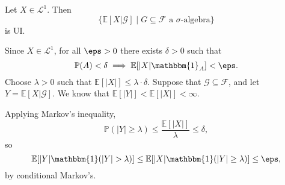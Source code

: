 \documentclass[12pt]{article}
\begin{document}
\begin{theorem}
	Let $X \in \mathcal{L}^1$. Then
	\[
		\{\mathbb{E}[X | \mathcal{G}] \mid G \subseteq \mathcal{F} \text{ a $\sigma$-algebra}\}
	\]
	is UI.
\end{theorem}

\begin{proofbox}
	Since $X \in \mathcal{L}^1$, for all $\eps > 0$ there exists $\delta > 0$ such that
	\[
	\mathbb{P}(A) < \delta \implies \mathbb{E}[|X| \mathbbm{1}_{A}] < \eps.
	\]
	Choose $\lambda > 0$ such that $\mathbb{E}[|X|] \leq \lambda \cdot \delta$. Suppose that $\mathcal{G} \subseteq \mathcal{F}$, and let $Y = \mathbb{E}[X|\mathcal{G}]$. We know that $\mathbb{E}[|Y|] < \mathbb{E}[|X|] < \infty$.

	Applying Markov's inequality,
	\[
	\mathbb{P}(|Y| \geq \lambda) \leq \frac{\mathbb{E}[|X|]}{\lambda} \leq \delta,
	\]
	so
	\[
	\mathbb{E}[|Y| \mathbbm{1}(|Y| > \lambda)] \leq \mathbb{E}[|X| \mathbbm{1}(|Y| \geq \lambda)] \leq \eps,
	\]
	by conditional Markov's.
\end{proofbox}



\newpage

\printindex
\end{document}
